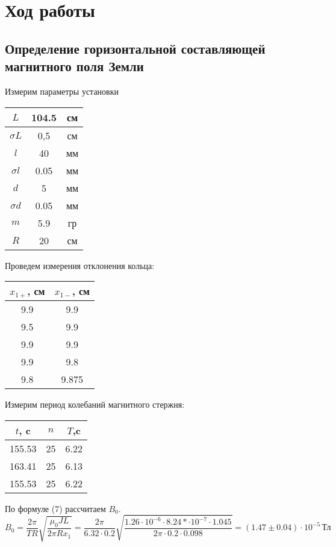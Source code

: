 \documentclass[a4paper,12pt]{article}
\begin{document}
		\section{Ход работы}
		\subsection{Определение горизонтальной составляющей магнитного поля Земли}
		Измерим параметры установки
		\begin{center}
			\begin{tabular}{c|c|c}
				   $L$ & 104.5 & см \\ 
			\hline $\sigma L$ & 0,5 & см \\ 
			\hline $l$ & 40 & мм \\ 
			\hline $\sigma l$ & 0.05 & мм \\ 
			\hline $d$ & 5 & мм \\ 
			\hline $\sigma d$ & 0.05 & мм \\ 
			\hline $m$ & 5.9 & гр \\
			\hline $R$ & 20 & см \\
		\end{tabular}
		\end{center} 
		Проведем измерения отклонения кольца:
		\begin{center}
			\begin{tabular}{c|c}
					   $x_{1+}$, см & $x_{1-}$, см \\
				\hline 9.9 & 9.9 \\
				\hline 9.5 & 9.9 \\
				\hline 9.9 & 9.9 \\
				\hline 9.9 & 9.8 \\
				\hline \hline
					  9.8 & 9.875 \\
			\end{tabular}
		\end{center}
		Измерим период колебаний магнитного стержня:
		\begin{center}
			\begin{tabular}{c|c|c}
				$t$, c & $n$ & $T$,c \\ \hline
				155.53 & 25 & 6.22 \\ \hline
				163.41 & 25 & 6.13 \\ \hline
				155.53 & 25 & 6.22 \\ \hline	
			\end{tabular}
		\end{center}
		По формуле (7) рассчитаем $B_0$.
		\begin{equation}
			B_0 = \frac{2\pi}{TR}\sqrt{\frac{\mu_0JL}{2\pi Rx_1}} = \frac{2\pi}{6.32\cdot 0.2}\sqrt{\frac{1.26\cdot 10^{-6}\cdot 8.24*\cdot 10^{-7}\cdot 1.045}{2\pi \cdot 0.2\cdot 0.098}} = \left(1.47 \pm 0.04\right)\cdot 10^{-5}\,\text{Тл}
		\end{equation}
\end{document}
